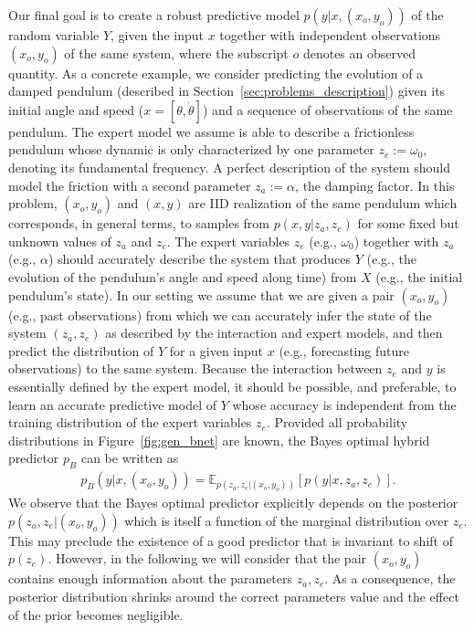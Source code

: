 \documentclass{article}
\newcommand\figref{Figure~\ref}
\newcommand\secref{Section~\ref}
\begin{document}
Our final goal is to create a robust predictive model $p(y|x, (x_o, y_o))$ of the random variable $Y$, given the input $x$ together with independent observations $(x_o, y_o)$ of the same system, where the subscript $o$ denotes an observed quantity. As a concrete example, we consider predicting the evolution of a damped pendulum (described in \secref{sec:problems_description}) given its initial angle and speed ($x = \left[ \theta, \dot\theta\right]$) and a sequence of observations of the same pendulum. The expert model we assume is able to describe a frictionless pendulum whose dynamic is only characterized by one parameter $z_e := \omega_0$, denoting its fundamental frequency. A perfect description of the system should model the friction with a second parameter $z_a := \alpha$, the damping factor. In this problem, $(x_o, y_o)$ and $(x, y)$ are IID realization of the same pendulum which corresponds, in general terms, to samples from $p(x, y|z_a, z_e)$ for some fixed but unknown values of $z_a$ and $z_e$. The expert variables $z_e$ (e.g., $\omega_0$) together with $z_a$ (e.g., $\alpha$) should accurately describe the system that produces $Y$ (e.g., the evolution of the pendulum's angle and speed along time) from $X$ (e.g., the initial pendulum's state). In our setting we assume that we are given a pair $(x_o, y_o)$ (e.g., past observations) from which we can accurately infer the state of the system $(z_a, z_e)$ as described by the interaction and expert models, and then predict the distribution of $Y$ for a given input $x$ (e.g., forecasting future observations) to the same system. Because the interaction between $z_e$ and $y$ is essentially defined by the expert model, it should be possible, and preferable, to learn an accurate predictive model of $Y$ whose accuracy is independent from the training distribution of the expert variables $z_e$. Provided all probability distributions in \figref{fig:gen_bnet} are known, the Bayes optimal hybrid predictor $p_B$ can be written as 
\begin{align}
    p_B(y|x, (x_o, y_o)) = \mathbb{E}_{p(z_a, z_e|(x_o, y_o))}\left[ p(y|x, z_a, z_e) \right]. \label{eq:hybrid_predictor}
\end{align}
We observe that the Bayes optimal predictor explicitly depends on the posterior $p(z_a, z_e|(x_o, y_o))$ which is itself a function of the marginal distribution over $z_e$. This may preclude the existence of a good predictor that is invariant to shift of $p(z_e)$. However, in the following we will consider that the pair $(x_o, y_o)$ contains enough information about the parameters $z_a, z_e$. As a consequence, the posterior distribution shrinks around the correct parameters value and the effect of the prior becomes negligible.
\end{document}
